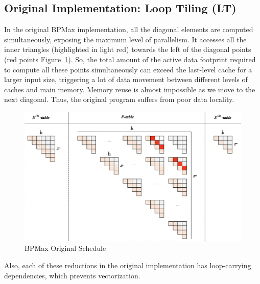 \subsection{Original Implementation: Loop Tiling (LT)} In the original BPMax implementation, all the diagonal elements are computed simultaneously, exposing the maximum level of parallelism. It accesses all the inner triangles  (highlighted in light red) towards the left of the diagonal points (red points Figure~\ref{fig:bpmax_original_schedule}). 
So, the total amount of the active data footprint required to compute all these points simultaneously can exceed the last-level cache for a larger input size, triggering a lot of data movement between different levels of caches and main memory. Memory reuse is almost impossible as we move to the next diagonal. Thus, the original program suffers from poor data locality.
\begin{figure}[htb]
\centerline{\includegraphics[scale=.30]{content/figures/bpmax_original_schedule.png}}
\caption{BPMax Original Schedule}
\label{fig:bpmax_original_schedule}
\end{figure}
Also, each of these reductions in the original implementation has loop-carrying dependencies, which prevents vectorization.

